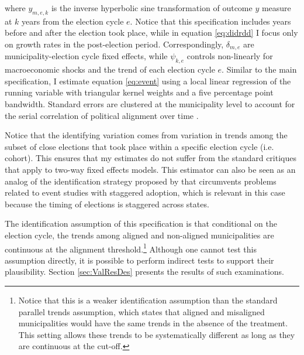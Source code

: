 \documentclass[dv_diss_main.tex]{subfiles}
\begin{document}
\noindent where  $y_{m,e,k}$ is the inverse hyperbolic sine transformation of outcome $y$ measure at $k$ years from the election cycle $e$. Notice that this specification includes years before and after the election took place, while in equation \eqref{eq:didrdd} I focus only on growth rates in the post-election period.  
Correspondingly, $\delta_{m,e}$ are municipality-election cycle fixed effects, while $\psi_{k,e}$ controls non-linearly for macroeconomic shocks and the trend of each election cycle $e$. Similar to the main specification, I estimate equation \eqref{eq:event} using a local linear regression of the running variable with triangular kernel weights and a five percentage point bandwidth. Standard errors are clustered at the municipality level to account for the serial correlation of political alignment over time \citep{bertrand2004much}. 

Notice that the identifying variation comes from variation in trends among the subset of close elections that took place within a specific election cycle (i.e. cohort). This ensures that my estimates do not suffer from the standard critiques that apply to two-way fixed effects models. This estimator can also be seen as an analog of the identification strategy proposed by \citep{cengiz2019effect} that circumvents problems related to event studies with staggered adoption, which is relevant in this case because the timing of elections is staggered across states. 



The identification assumption of this specification is that conditional on the election cycle, the trends among aligned and non-aligned municipalities are continuous at the alignment threshold.\footnote{Notice that this is a weaker identification assumption than the standard parallel trends assumption, which states that aligned and misaligned municipalities would have the same trends in the absence of the treatment. This setting allows these trends to be systematically different as long as they are continuous at the  cut-off.} Although one cannot test this assumption directly, it is possible to perform indirect tests to support their plausibility. Section \ref{sec:ValResDes} presents the results of such examinations. 
\end{document}
